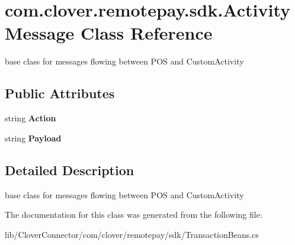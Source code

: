 \hypertarget{classcom_1_1clover_1_1remotepay_1_1sdk_1_1_activity_message}{}\section{com.\+clover.\+remotepay.\+sdk.\+Activity\+Message Class Reference}
\label{classcom_1_1clover_1_1remotepay_1_1sdk_1_1_activity_message}


base class for messages flowing between P\+OS and Custom\+Activity  


\subsection*{Public Attributes}
\begin{DoxyCompactItemize}
\item 
\mbox{\label{classcom_1_1clover_1_1remotepay_1_1sdk_1_1_activity_message_a1ad0c129d12c2e98d111465bc3ee29e4}} 
string {\bfseries Action}
\item 
\mbox{\label{classcom_1_1clover_1_1remotepay_1_1sdk_1_1_activity_message_a986e24b00f597aa74e0dcf8b25e42338}} 
string {\bfseries Payload}
\end{DoxyCompactItemize}


\subsection{Detailed Description}
base class for messages flowing between P\+OS and Custom\+Activity 



The documentation for this class was generated from the following file\+:\begin{DoxyCompactItemize}
\item 
lib/\+Clover\+Connector/com/clover/remotepay/sdk/Transaction\+Beans.\+cs\end{DoxyCompactItemize}

